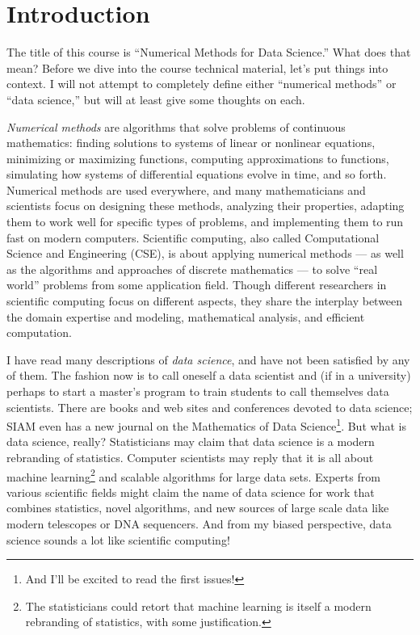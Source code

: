 \documentclass[12pt, leqno]{article} %
\begin{document}

\section{Introduction}

The title of this course is ``Numerical Methods for Data Science.''
What does that mean?  Before we dive into the course technical
material, let's put things into context.  I will not attempt to
completely define either ``numerical methods'' or ``data science,''
but will at least give some thoughts on each.

{\em Numerical methods} are algorithms that solve problems of
continuous mathematics: finding solutions to systems of linear or
nonlinear equations, minimizing or maximizing functions, computing
approximations to functions, simulating how systems of differential
equations evolve in time, and so forth.  Numerical methods are used
everywhere, and many mathematicians and scientists focus on designing
these methods, analyzing their properties, adapting them to work well
for specific types of problems, and implementing them to run fast on
modern computers.  Scientific computing, also called Computational
Science and Engineering (CSE), is about applying numerical methods ---
as well as the algorithms and approaches of discrete mathematics ---
to solve ``real world'' problems from some application field.
Though different researchers in scientific computing focus on different
aspects, they share the interplay between the domain expertise and
modeling, mathematical analysis, and efficient computation.

I have read many descriptions of {\em data science}, and have not been
satisfied by any of them.
The fashion now is to call oneself a data
scientist and (if in a university) perhaps to start a master's program
to train students to call themselves data scientists.  There are books
and web sites and conferences devoted to data science; SIAM even has a new
journal on the Mathematics of Data Science\footnote{%
  And I'll be excited to read the first issues!
}.
But what is data science, really?
Statisticians
may claim that data science is a modern rebranding of statistics.
Computer scientists may reply that it is all about machine
learning\footnote{The statisticians could retort that machine learning
  is itself a modern rebranding of statistics, with some
  justification.} and scalable algorithms for large data sets.
Experts from various scientific fields might claim the name of data
science for work that combines statistics, novel algorithms, and new
sources of large scale data like modern telescopes or DNA sequencers.
And from my biased perspective, data science sounds a lot like scientific computing!
\end{document}
